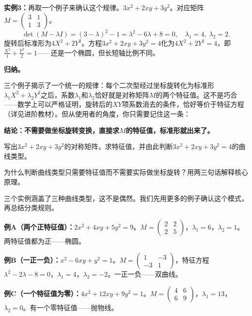 \vspace{0.2cm}
\noindent\textbf{实例3：}再取一个例子来确认这个规律。$3x^2+2xy+3y^2$。对应矩阵$M=\begin{pmatrix}3&1\\1&3\end{pmatrix}$。
\[
\det(M-\lambda I)=(3-\lambda)^2-1=\lambda^2-6\lambda+8=0,\quad\lambda_1=4,\;\lambda_2=2.
\]
旋转后标准形为$4X^2+2Y^2$。方程$3x^2+2xy+3y^2=4$化为$4X^2+2Y^2=4$，即$\frac{X^2}{1}+\frac{Y^2}{2}=1$——还是一个椭圆，但长短轴比例不同。

\vspace{0.2cm}
\noindent\textbf{归纳。}

三个例子揭示了一个统一的规律：每个二次型经过坐标旋转化为标准形$\lambda_1X^2+\lambda_2Y^2$之后，系数$\lambda_1$和$\lambda_2$恰好就是对称矩阵$M$的两个特征值。这不是巧合——数学上可以严格证明，旋转后的$XY$项系数消去的条件，恰好等价于特征方程（详见进阶教材）。但从使用者的角度，你只需要记住这一条：

\textbf{结论：不需要做坐标旋转变换，直接求$M$的特征值，标准形就出来了。}

\begin{exercise}
\item 写出$3x^2+2xy+3y^2$的对称矩阵，求特征值，并由此判断$3x^2+2xy+3y^2=4$的曲线类型。
\item 为什么判断曲线类型只需要特征值而不需要实际做坐标旋转？用两三句话解释核心原理。
\end{exercise}


三个实例涵盖了三种曲线类型，这不是偶然。我们先用更多的例子确认这个模式，再总结分类规则。

\vspace{0.2cm}
\noindent\textbf{例A（两个正特征值）：}$2x^2+4xy+5y^2=9$。$M=\begin{pmatrix}2&2\\2&5\end{pmatrix}$，$\lambda_1=6$，$\lambda_2=1$。两特征值都为正——椭圆。

\vspace{0.2cm}
\noindent\textbf{例B（一正一负）：}$x^2-6xy+y^2=1$。$M=\begin{pmatrix}1&-3\\-3&1\end{pmatrix}$，特征方程$\lambda^2-2\lambda-8=0$，$\lambda_1=4$，$\lambda_2=-2$。一正一负——双曲线。

\vspace{0.2cm}
\noindent\textbf{例C（一个特征值为零）：}$4x^2+12xy+9y^2=1$。$M=\begin{pmatrix}4&6\\6&9\end{pmatrix}$，$\lambda_1=13$，$\lambda_2=0$。有一个零特征值——抛物线。

